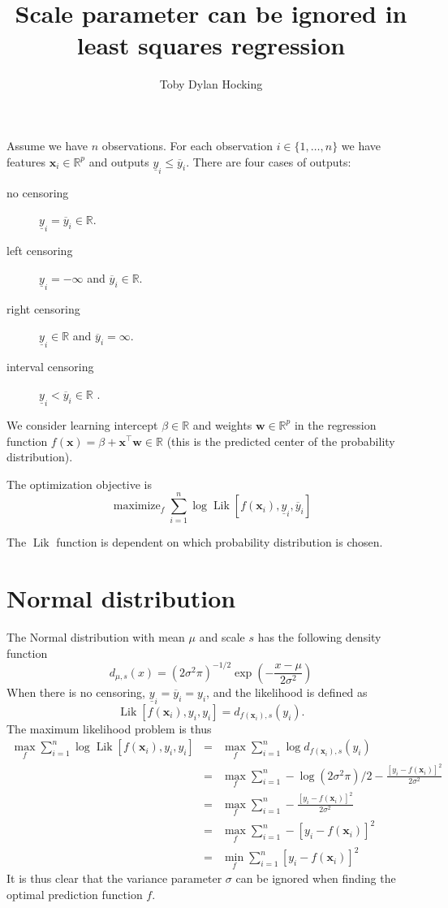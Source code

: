 \documentclass{article}
\DeclareMathOperator*{\Lik}{Lik}
\DeclareMathOperator*{\maximize}{maximize}
\newcommand{\RR}{\mathbb R}
\begin{document}
\title{Scale parameter can be ignored in least squares regression}
\author{Toby Dylan Hocking}
\maketitle

Assume we have $n$ observations. For each observation
$i\in\{1,\dots,n\}$ we have features $\mathbf x_i\in\RR^p$ and
outputs $\underline y_i \leq \overline y_i$. There are four cases of
outputs:
\begin{description}
\item[no censoring] $\underline y_i = \overline y_i \in\RR$.
\item[left censoring] $\underline y_i=-\infty$ and $\overline y_i \in\RR$.
\item[right censoring] $\underline y_i\in\RR$ and $\overline y_i=\infty$.
\item[interval censoring] $\underline y_i<\overline y_i\in\RR$ .
\end{description}

We consider learning intercept $\beta\in\RR$ and weights
$\mathbf w\in\RR^p$ in the regression function
$f(\mathbf x)=\beta + \mathbf x^\intercal \mathbf w \in\RR$ (this is
the predicted center of the probability distribution).

The optimization objective is
\begin{equation}
  \maximize_f \sum_{i=1}^n\log\Lik[f(\mathbf x_i),\underline y_i, \overline y_i]
\end{equation}

The $\Lik$ function is dependent on which probability distribution is chosen.

\section{Normal distribution}

The Normal distribution with mean $\mu$ and scale $s$ has the
following density function
\begin{equation}
  d_{\mu, s}(x) = (2\sigma^2\pi)^{-1/2} \exp\left(
    -\frac{x-\mu}{2\sigma^2}
  \right)
\end{equation}
When there is no censoring, $\underline y_i = \overline y_i = y_i$,
and the likelihood is defined as
\begin{equation}
  \Lik[f(\mathbf x_i), y_i, y_i] = d_{f(\mathbf x_i),s}(y_i).
\end{equation}
The maximum likelihood problem is thus
\begin{eqnarray}
  \max_f \sum_{i=1}^n \log \Lik[f(\mathbf x_i), y_i, y_i] 
  &=& \max_f \sum_{i=1}^n \log d_{f(\mathbf x_i),s}(y_i)\\
  &=& \max_f \sum_{i=1}^n -\log(2\sigma^2\pi)/2 - \frac{
      [y_i-f(\mathbf x_i)]^2}{
      2\sigma^2}\\
  &=& \max_f \sum_{i=1}^n - \frac{
      [y_i-f(\mathbf x_i)]^2}{
      2\sigma^2} \\
  &=& \max_f\sum_{i=1}^n  - [y_i-f(\mathbf x_i)]^2\\
  &=& \min_f \sum_{i=1}^n  [y_i-f(\mathbf x_i)]^2
\end{eqnarray}
It is thus clear that the variance parameter $\sigma$ can be ignored
when finding the optimal prediction function $f$.
\end{document}
